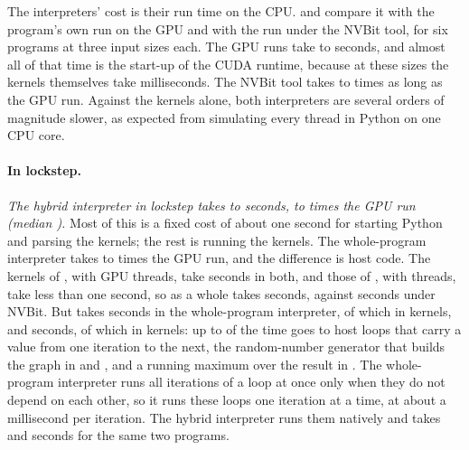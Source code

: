 The interpreters' cost is their run time on the CPU.  and  compare it
with the program's own run on the GPU and with the run under the NVBit tool, for six programs at three input sizes
each. The GPU runs take \numNativeLo{} to \numNativeHi{} seconds, and almost all of that time is the start-up of
the CUDA runtime, because at these sizes the kernels themselves take milliseconds. The NVBit tool takes
\numNvbitLo{} to \numNvbitHi{} times as long as the GPU run. Against the kernels alone, both interpreters are
several orders of magnitude slower, as expected from simulating every thread in Python on one CPU core.

\paragraph{In lockstep.} \textit{The hybrid interpreter in lockstep takes \numHyLockLoS{} to \numHyLockHiS{}
seconds, \numHyOverheadLo{} to \numHyOverheadHi{} times the GPU run (median \numHyOverheadMedian{}).} Most of
this is a fixed cost of about one second for starting Python and parsing the kernels; the rest is running the
kernels. The whole-program interpreter takes \numOverheadLo{} to \numOverheadHi{} times the GPU run, and the
difference is host code. The kernels of , with \numChainThreads{} GPU threads, take \numChainKernelS{}
seconds in both, and those of , with \numRbfsThreads{} threads, take less than one second, so
 as a whole takes \numRbfsLockS{} seconds, against \numRbfsNvbitS{} seconds under NVBit. But
 takes \numWlbfsLockS{} seconds in the whole-program interpreter, of which \numWlbfsKernelS{} in
kernels, and  \numBfsLockS{} seconds, of which \numBfsKernelS{} in kernels: up to \numHostShareMax{} of
the time goes to host loops that carry a value from one iteration to the next, the random-number generator that
builds the graph in  and , and a running maximum over the result in . The
whole-program interpreter runs all iterations of a loop at once only when they do not depend on each other, so it
runs these loops one iteration at a time, at about a millisecond per iteration. The hybrid interpreter runs them
natively and takes \numWlbfsHyLockS{} and \numBfsHyLockS{} seconds for the same two programs.

